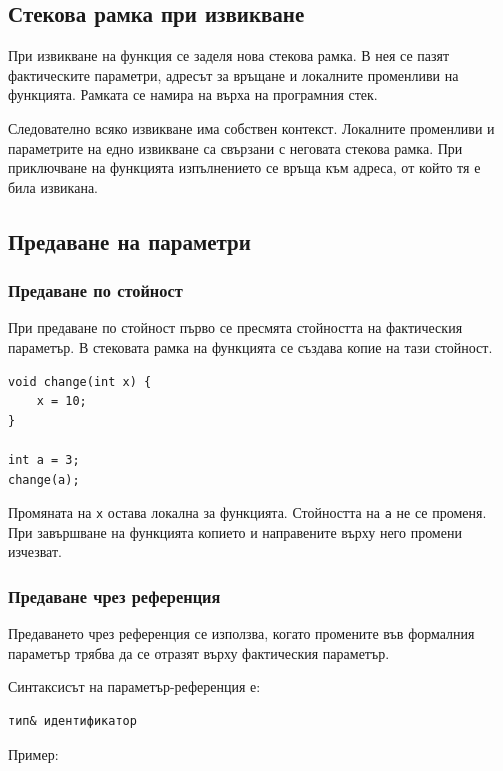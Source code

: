 \subsection{Стекова рамка при извикване}\label{s:14.6.4}

При извикване на функция се заделя нова стекова рамка. В нея се пазят фактическите параметри, адресът за връщане и локалните променливи на функцията. Рамката се намира на върха на програмния стек.

Следователно всяко извикване има собствен контекст. Локалните променливи и параметрите на едно извикване са свързани с неговата стекова рамка. При приключване на функцията изпълнението се връща към адреса, от който тя е била извикана.

\subsection{Предаване на параметри}\label{s:14.6.5}

\subsubsection{Предаване по стойност}

При предаване по стойност първо се пресмята стойността на фактическия параметър. В стековата рамка на функцията се създава копие на тази стойност.

\begin{verbatim}
void change(int x) {
    x = 10;
}

int a = 3;
change(a);
\end{verbatim}

Промяната на \texttt{x} остава локална за функцията. Стойността на \texttt{a} не се променя. При завършване на функцията копието и направените върху него промени изчезват.

\subsubsection{Предаване чрез референция}

Предаването чрез референция се използва, когато промените във формалния параметър трябва да се отразят върху фактическия параметър.

Синтаксисът на параметър-референция е:

\begin{verbatim}
тип& идентификатор
\end{verbatim}

Пример:

